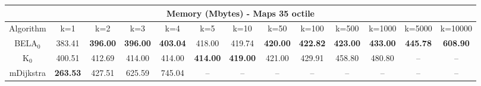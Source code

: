 \begin{tabular}{c|cccccccccccc}\toprule
\multicolumn{13}{c}{Memory (Mbytes) - Maps 35 octile}\\ \midrule
Algorithm & k=1 & k=2 & k=3 & k=4 & k=5 & k=10 & k=50 & k=100 & k=500 & k=1000 & k=5000 & k=10000 \\ \midrule
BELA$_0$ & 383.41 & \textbf{396.00} & \textbf{396.00} & \textbf{403.04} & 418.00 & 419.74 & \textbf{420.00} & \textbf{422.82} & \textbf{423.00} & \textbf{433.00} & \textbf{445.78} & \textbf{608.90} \\
K$_0$ & 400.51 & 412.69 & 414.00 & 414.00 & \textbf{414.00} & \textbf{419.00} & 421.00 & 429.91 & 458.80 & 480.80 & -- & -- \\
mDijkstra & \textbf{263.53} & 427.51 & 625.59 & 745.04 & -- & -- & -- & -- & -- & -- & -- & -- \\ \bottomrule 
\end{tabular}
